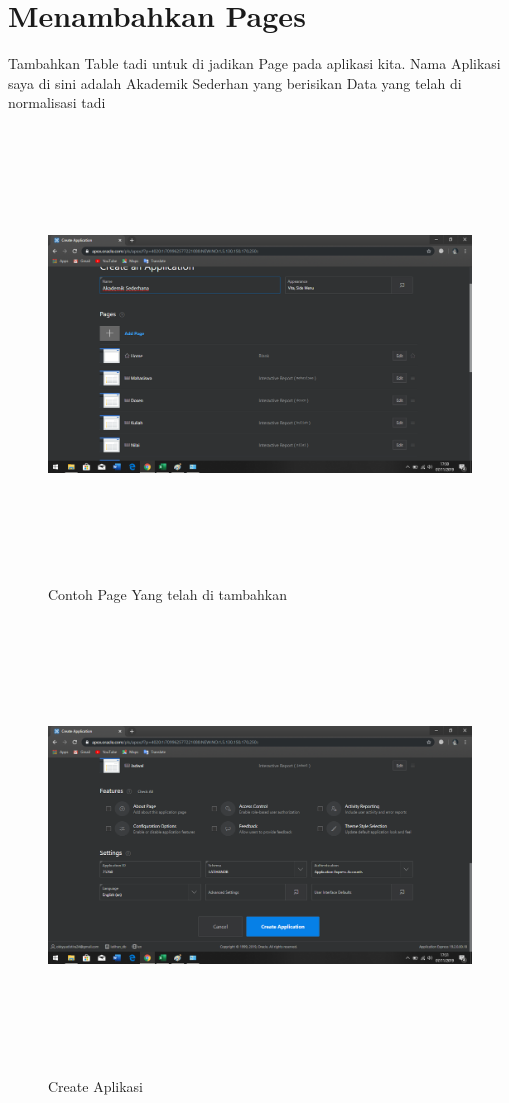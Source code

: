 \documentclass[a4, 13pt]{article}
\begin{document}
      \section{Menambahkan Pages}
     Tambahkan Table tadi untuk di jadikan Page pada aplikasi kita. Nama Aplikasi saya di sini adalah Akademik Sederhan yang berisikan Data yang telah di normalisasi tadi
     \begin{figure}[!htbp]
        \centering
        \includegraphics[width=16cm, height=12cm]{pictures/J.png}
        \caption{Contoh Page Yang telah di tambahkan}
        \label{fig:my_label}
    \end{figure}
     \begin{figure}[!htbp]
        \centering
        \includegraphics[width=16cm, height=12cm]{pictures/K.png}
        \caption{Create Aplikasi}
        \label{fig:my_label}
    \end{figure}
\end{document}
